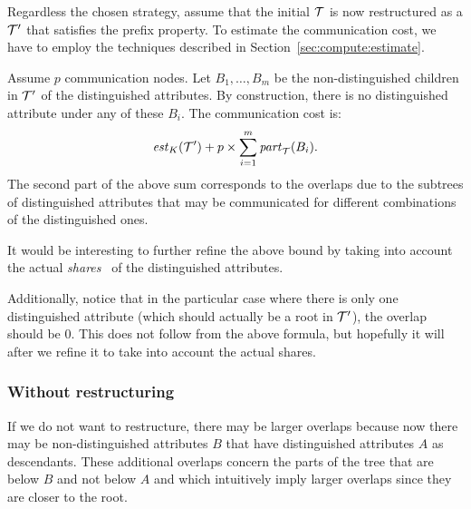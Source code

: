 Regardless the chosen strategy, assume that the initial $\mathcal T$ is now restructured as a $\mathcal T'$ that satisfies the prefix property.
To estimate the communication cost, we have to employ the techniques described in Section~\ref{sec:compute:estimate}.

Assume $p$ communication nodes.
Let $B_1,\ldots, B_m$ be the non-distinguished children in $\mathcal T'$ of the distinguished attributes.
By construction, there is no distinguished attribute under any of these $B_i$.
The communication cost is:
\[
\mathit{est}_K(\mathcal T') + p\times \sum_{i=1}^m\mathit{part}_\mathcal T(B_i).
\]
The second part of the above sum corresponds to the overlaps due to the subtrees of distinguished attributes that may be communicated for different combinations of the distinguished ones.

It would be interesting to further refine the above bound by taking into account the actual {\em shares}~\cite{AfUl11} of the distinguished attributes.

Additionally, notice that in the particular case where there is only one distinguished attribute (which should actually be a root in $\mathcal T'$), the overlap should be 0.
This does not follow from the above formula, but hopefully it will after we refine it to take into account the actual shares.


\subsubsection{Without restructuring}
If we do not want to restructure, there may be larger overlaps because now there may be non-distinguished attributes $B$ that have distinguished attributes $A$ as descendants.
These additional overlaps concern the parts of the tree that are below $B$ and not below $A$ and which intuitively imply larger overlaps since they are closer to the root.


